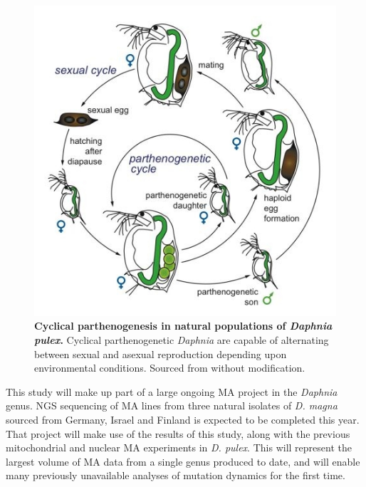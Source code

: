 \documentclass[12pt,twoside]{reedthesis}
\begin{document}
\begin{figure}[h!]
    \begin{center}
        \includegraphics[scale=0.7]{../figures/daphnia_life_cycle.jpg}
    \end{center}
    \caption[Cyclical parthenogenesis in natural populations of \textit{Daphnia pulex}]{\textbf{Cyclical parthenogenesis in natural populations of \textit{Daphnia pulex}.} Cyclical parthenogenetic \textit{Daphnia} are capable of alternating between sexual and asexual reproduction depending upon environmental conditions. Sourced from \citealp{ebert_ecology_2005} without modification.}
    \label{daph_life_cycle}
\end{figure}

This study will make up part of a large ongoing \gls{MA} project in the \textit{Daphnia} genus.
\gls{NGS} sequencing of \gls{MA} lines from three natural isolates of \textit{D. magna} sourced from Germany, Israel and Finland is expected to be completed this year. 
That project will make use of the results of this study, along with the previous mitochondrial \citep{xu_high_2012} and nuclear \citep{keith_high_2015} \gls{MA} experiments in \textit{D. pulex}.
This will represent the largest volume of \gls{MA} data from a single genus produced to date, and will enable many previously unavailable analyses of mutation dynamics for the first time.
\end{document}
